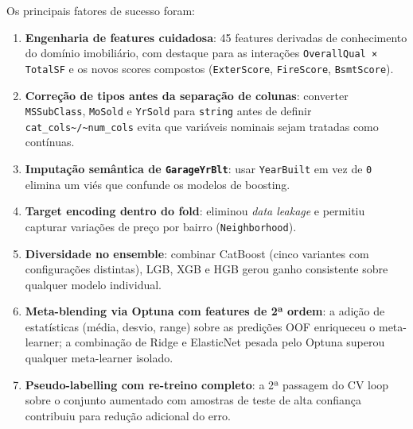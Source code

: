 \documentclass[12pt,a4paper]{article}
\begin{document}
Os principais fatores de sucesso foram:

\begin{enumerate}
\item \textbf{Engenharia de features cuidadosa}: 45 features derivadas de conhecimento
do domínio imobiliário, com destaque para as interações \texttt{OverallQual × TotalSF}
e os novos scores compostos (\texttt{ExterScore}, \texttt{FireScore}, \texttt{BsmtScore}).

\item \textbf{Correção de tipos antes da separação de colunas}: converter \texttt{MSSubClass},
\texttt{MoSold} e \texttt{YrSold} para \texttt{string} antes de definir \texttt{cat\_cols\textasciitilde{}/\textasciitilde{}num\_cols}
evita que variáveis nominais sejam tratadas como contínuas.

\item \textbf{Imputação semântica de \texttt{GarageYrBlt}}: usar \texttt{YearBuilt} em vez de \texttt{0}
elimina um viés que confunde os modelos de boosting.

\item \textbf{Target encoding dentro do fold}: eliminou \emph{data leakage} e permitiu
capturar variações de preço por bairro (\texttt{Neighborhood}).

\item \textbf{Diversidade no ensemble}: combinar CatBoost (cinco variantes com
configurações distintas), LGB, XGB e HGB gerou ganho consistente sobre
qualquer modelo individual.

\item \textbf{Meta-blending via Optuna com features de 2ª ordem}: a adição de
estatísticas (média, desvio, range) sobre as predições OOF enriqueceu
o meta-learner; a combinação de Ridge e ElasticNet pesada pelo Optuna
superou qualquer meta-learner isolado.

\item \textbf{Pseudo-labelling com re-treino completo}: a 2ª passagem do CV loop sobre
o conjunto aumentado com amostras de teste de alta confiança contribuiu
para redução adicional do erro.
\end{enumerate}
\end{document}
